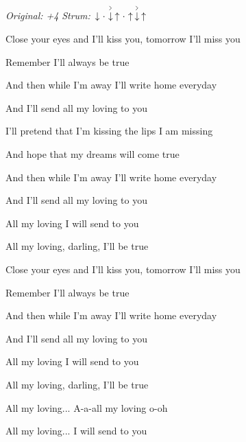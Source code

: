 \begin{song}


\begin{headerbox}
\RaiseBoxWithAccents
\textit{Original: +4} \quad
\textit{Strum:} $\Down\Miss\AccentDown\Up\Miss\Up\AccentDown\Up$
\end{headerbox}

\begin{hchordbox}
\end{hchordbox}

\large

\bigskip

Close your eyes and I'll kiss you, tomorrow I'll miss you \par
Remember I'll always be true  \par
And then while I'm away I'll write home everyday \par
And I'll send all my loving to you \par

\bigskip

I'll pretend that I'm kissing the lips I am missing \par
And hope that my dreams will come true  \par
And then while I'm away I'll write home everyday \par
And I'll send all my loving to you \par

\bigskip

All my loving I will send to you \par
All my loving, darling, I'll be true \par

\bigskip

Close your eyes and I'll kiss you, tomorrow I'll miss you \par
Remember I'll always be true  \par
And then while I'm away I'll write home everyday \par
And I'll send all my loving to you \par

\bigskip

All my loving I will send to you \par
All my loving, darling, I'll be true \par

\bigskip

All my loving... A-a-all my loving o-oh \par
All my loving... I will send to you  \par

\end{song}
